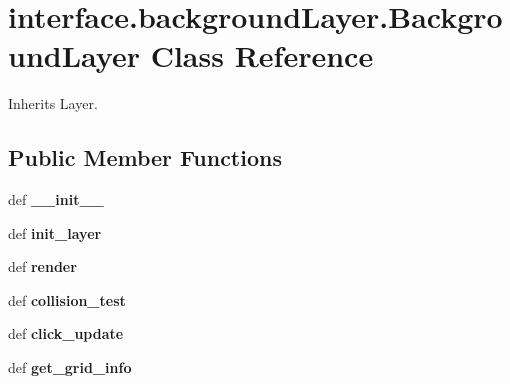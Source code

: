 \hypertarget{classinterface_1_1background_layer_1_1_background_layer}{\section{interface.\-background\-Layer.\-Background\-Layer \-Class \-Reference}
\label{classinterface_1_1background_layer_1_1_background_layer}
}


\-Inherits \-Layer.

\subsection*{\-Public \-Member \-Functions}
\begin{DoxyCompactItemize}
\item 
\hypertarget{classinterface_1_1background_layer_1_1_background_layer_af257423ed8d9313e0475362c324202c9}{def {\bfseries \-\_\-\-\_\-init\-\_\-\-\_\-}}\label{classinterface_1_1background_layer_1_1_background_layer_af257423ed8d9313e0475362c324202c9}

\item 
\hypertarget{classinterface_1_1background_layer_1_1_background_layer_a6d7484a41cbf588ab4597bef7b6e7022}{def {\bfseries init\-\_\-layer}}\label{classinterface_1_1background_layer_1_1_background_layer_a6d7484a41cbf588ab4597bef7b6e7022}

\item 
\hypertarget{classinterface_1_1background_layer_1_1_background_layer_a58f320247509a923655984a8036c0e8d}{def {\bfseries render}}\label{classinterface_1_1background_layer_1_1_background_layer_a58f320247509a923655984a8036c0e8d}

\item 
\hypertarget{classinterface_1_1background_layer_1_1_background_layer_abca4c37ad5c2143dba4b8b7197ac5e4e}{def {\bfseries collision\-\_\-test}}\label{classinterface_1_1background_layer_1_1_background_layer_abca4c37ad5c2143dba4b8b7197ac5e4e}

\item 
\hypertarget{classinterface_1_1background_layer_1_1_background_layer_a7fe52fb9c4566ab8952ebbde64a4a81c}{def {\bfseries click\-\_\-update}}\label{classinterface_1_1background_layer_1_1_background_layer_a7fe52fb9c4566ab8952ebbde64a4a81c}

\item 
\hypertarget{classinterface_1_1background_layer_1_1_background_layer_aca2b1f90b6c13b92f9be91f07a60e981}{def {\bfseries get\-\_\-grid\-\_\-info}}\label{classinterface_1_1background_layer_1_1_background_layer_aca2b1f90b6c13b92f9be91f07a60e981}

\end{DoxyCompactItemize}
